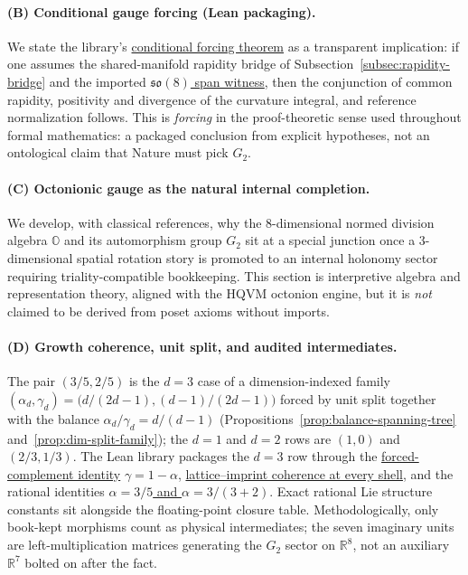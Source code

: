\documentclass[11pt]{amsart}
\begin{document}
\paragraph{(B) Conditional gauge forcing (Lean packaging).}
We state the library's \hyperref[lean:forcing-theorem]{conditional forcing theorem} as a transparent implication: if one assumes the shared-manifold rapidity bridge of Subsection~\ref{subsec:rapidity-bridge} and the imported \hyperref[lean:so8-witness]{\(\mathfrak{so}(8)\) span witness}, then the conjunction of common rapidity, positivity and divergence of the curvature integral, and reference normalization follows. This is \emph{forcing} in the proof-theoretic sense used throughout formal mathematics: a packaged conclusion from explicit hypotheses, not an ontological claim that Nature must pick \(G_2\).

\paragraph{(C) Octonionic gauge as the natural internal completion.}
We develop, with classical references, why the \(8\)-dimensional normed division algebra \(\mathbb{O}\) and its automorphism group \(G_2\) sit at a special junction once a \(3\)-dimensional spatial rotation story is promoted to an internal holonomy sector requiring triality-compatible bookkeeping. This section is interpretive algebra and representation theory, aligned with the HQVM octonion engine, but it is \emph{not} claimed to be derived from poset axioms without imports.

\paragraph{(D) Growth coherence, unit split, and audited intermediates.}
The pair \((3/5,2/5)\) is the \(d=3\) case of a dimension-indexed family \((\alpha_d,\gamma_d)=\bigl(d/(2d-1),(d-1)/(2d-1)\bigr)\) forced by unit split together with the balance \(\alpha_d/\gamma_d=d/(d-1)\) (Propositions~\ref{prop:balance-spanning-tree} and~\ref{prop:dim-split-family}); the \(d=1\) and \(d=2\) rows are \((1,0)\) and \((2/3,1/3)\). The Lean library packages the \(d=3\) row through the \hyperref[lean:gamma-complement]{forced-complement identity} \(\gamma=1-\alpha\), \hyperref[lean:lattice-ratio]{lattice--imprint coherence at every shell}, and the rational identities \hyperref[lean:alpha-3-5]{\(\alpha=3/5\) and \(\alpha=3/(3+2)\)}. Exact rational Lie structure constants sit alongside the floating-point closure table. Methodologically, only book-kept morphisms count as physical intermediates; the seven imaginary units are left-multiplication matrices generating the \(G_2\) sector on \(\mathbb{R}^8\), not an auxiliary \(\mathbb{R}^7\) bolted on after the fact.
\end{document}
